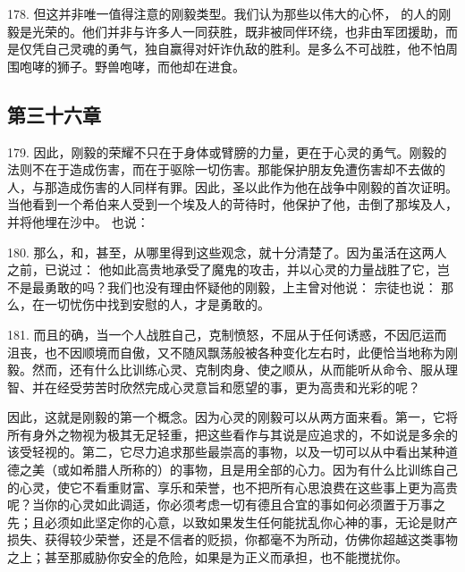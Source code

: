 178. 但这并非唯一值得注意的刚毅类型。我们认为那些以伟大的心怀， 的人的刚毅是光荣的。他们并非与许多人一同获胜，既非被同伴环绕，也非由军团援助，而是仅凭自己灵魂的勇气，独自赢得对奸诈仇敌的胜利。是多么不可战胜，他不怕周围咆哮的狮子。野兽咆哮，而他却在进食。\par


\subsection{第三十六章}

\par

179. 因此，刚毅的荣耀不只在于身体或臂膀的力量，更在于心灵的勇气。刚毅的法则不在于造成伤害，而在于驱除一切伤害。那能保护朋友免遭伤害却不去做的人，与那造成伤害的人同样有罪。因此，圣以此作为他在战争中刚毅的首次证明。当他看到一个希伯来人受到一个埃及人的苛待时，他保护了他，击倒了那埃及人，并将他埋在沙中。 也说：\par

180. 那么，和，甚至，从哪里得到这些观念，就十分清楚了。因为虽活在这两人之前，已说过： 他如此高贵地承受了魔鬼的攻击，并以心灵的力量战胜了它，岂不是最勇敢的吗？我们也没有理由怀疑他的刚毅，上主曾对他说： 宗徒也说： 那么，在一切忧伤中找到安慰的人，才是勇敢的。\par

181. 而且的确，当一个人战胜自己，克制愤怒，不屈从于任何诱惑，不因厄运而沮丧，也不因顺境而自傲，又不随风飘荡般被各种变化左右时，此便恰当地称为刚毅。然而，还有什么比训练心灵、克制肉身、使之顺从，从而能听从命令、服从理智、并在经受劳苦时欣然完成心灵意旨和愿望的事，更为高贵和光彩的呢？\par

因此，这就是刚毅的第一个概念。因为心灵的刚毅可以从两方面来看。第一，它将所有身外之物视为极其无足轻重，把这些看作与其说是应追求的，不如说是多余的该受轻视的。第二，它尽力追求那些最崇高的事物，以及一切可以从中看出某种道德之美（或如希腊人所称的）的事物，且是用全部的心力。因为有什么比训练自己的心灵，使它不看重财富、享乐和荣誉，也不把所有心思浪费在这些事上更为高贵呢？当你的心灵如此调适，你必须考虑一切有德且合宜的事如何必须置于万事之先；且必须如此坚定你的心意，以致如果发生任何能扰乱你心神的事，无论是财产损失、获得较少荣誉，还是不信者的贬损，你都毫不为所动，仿佛你超越这类事物之上；甚至那威胁你安全的危险，如果是为正义而承担，也不能搅扰你。\par

